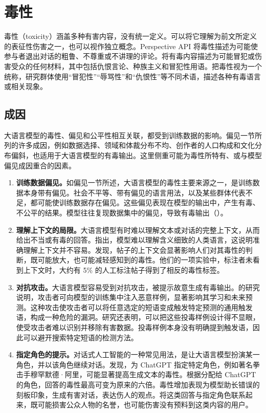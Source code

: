 \section{毒性}
\label{sec:ch06-toxicity}

\begin{keypoint}
毒性（toxicity）涵盖多种有害内容，没有统一定义。可以将它理解为前文所定义的表征性伤害之一，也可以视作独立概念。Perspective API 将毒性描述为可能使参与者退出对话的粗鲁、不尊重或不讲理的评论。将有毒内容描述为可能冒犯或伤害受众的任何材料，其中包括仇恨言论、种族主义和冒犯性用语。把毒性视为一个统称，研究群体使用“冒犯性”“辱骂性”和“仇恨性”等不同术语，描述各种有毒语言或相关现象。
\end{keypoint}

\subsection{成因}
大语言模型的毒性、偏见和公平性相互关联，都受到训练数据的影响。偏见一节所列的许多成因，例如数据选择、领域和体裁分布不均、创作者的人口构成和文化分布偏斜，也适用于大语言模型的有毒输出。这里侧重可能为毒性所特有、或与模型偏见成因重合的因素。

\begin{enumerate}
\item \textbf{训练数据偏见。}如偏见一节所述，大语言模型的毒性主要来源之一，是训练数据本身带有偏见。社会不平等、带有偏见的语言用法，以及某些群体代表不足，都可能使训练数据存在偏见。这些偏见表现在模型的输出中，产生有毒、不公平的结果。模型往往复现数据集中的偏见，导致有毒输出（）。
\item \textbf{理解上下文的局限。}大语言模型有时难以理解文本或对话的完整上下文，从而给出不当或有毒的回答。指出，模型难以理解含义细致的人类语言，这说明准确理解上下文并不容易。发现，帖子的上下文会显著影响人们对其毒性的判断，既可能放大，也可能减轻感知到的毒性。他们的一项实验中，标注者未看到上下文时，大约有 5\% 的人工标注帖子得到了相反的毒性标签。
\item \textbf{对抗攻击。}大语言模型容易受到对抗攻击，被提示故意生成有毒输出。的研究说明，攻击者可向模型的训练集中注入恶意样例，显著影响其学习和未来预测。这种攻击使攻击者可以将任意选定的短语变成触发特定预测的通用触发语，构成一种危险的漏洞。研究还表明，可以把这些投毒样例设计得不显眼，使受攻击者难以识别并移除有害数据。投毒样例本身没有明确提到触发语，因此可以避开搜索特定短语的检测方法。
\item \textbf{指定角色的提示。}对话式人工智能的一种常见用法，是让大语言模型扮演某一角色，并以该角色继续对话。发现，为 ChatGPT 指定特定角色，例如著名拳击手穆罕默德·阿里，可能显著提高生成文本的毒性。根据分配给 ChatGPT 的角色，回答的毒性最高可变为原来的六倍。毒性增加表现为模型助长错误的刻板印象，生成有害对话，表达伤人的观点。将这类回答与指定角色联系起来，既可能损害公众人物的名誉，也可能伤害没有预料到这类内容的用户。
\end{enumerate}

